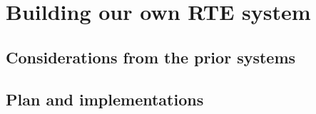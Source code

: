 
\section{Building our own RTE system}

\subsection{Considerations from the prior systems}

\subsection{Plan and implementations}
